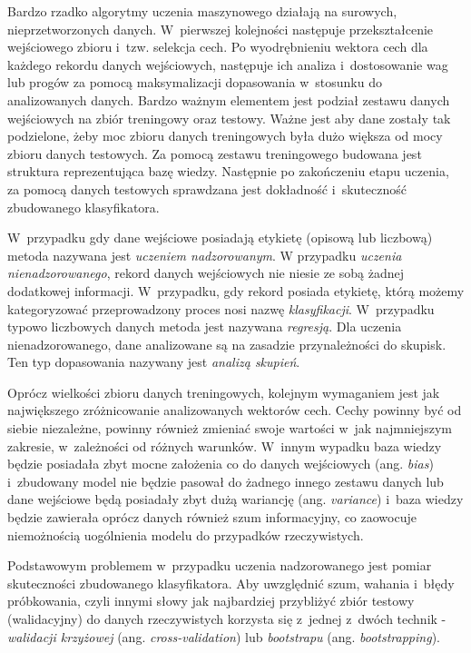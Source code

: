     Bardzo rzadko algorytmy uczenia maszynowego działają na surowych, nieprzetworzonych danych. W~pierwszej kolejności następuje przekształcenie wejściowego zbioru i~tzw. selekcja cech. Po wyodrębnieniu wektora cech dla każdego rekordu danych wejściowych, następuje ich analiza i~dostosowanie wag lub progów za pomocą maksymalizacji dopasowania w~stosunku do analizowanych danych. Bardzo ważnym elementem jest podział zestawu danych wejściowych na zbiór treningowy oraz testowy. Ważne jest aby dane zostały tak podzielone, żeby moc zbioru danych treningowych była dużo większa od mocy zbioru danych testowych. Za pomocą zestawu treningowego budowana jest struktura reprezentująca bazę wiedzy. Następnie po zakończeniu etapu uczenia, za pomocą danych testowych sprawdzana jest dokładność i~skuteczność zbudowanego klasyfikatora.

    W~przypadku gdy dane wejściowe posiadają etykietę (opisową lub liczbową) metoda nazywana jest \textit{uczeniem nadzorowanym}. W przypadku \textit{uczenia nienadzorowanego}, rekord danych wejściowych nie niesie ze sobą żadnej dodatkowej informacji. W~przypadku, gdy rekord posiada etykietę, którą możemy kategoryzować przeprowadzony proces nosi nazwę \textit{klasyfikacji}. W~przypadku typowo liczbowych danych metoda jest nazywana \textit{regresją}. Dla uczenia nienadzorowanego, dane analizowane są na zasadzie przynależności do skupisk. Ten typ dopasowania nazywany jest \textit{analizą skupień}.

    Oprócz wielkości zbioru danych treningowych, kolejnym wymaganiem jest jak największego zróżnicowanie analizowanych wektorów cech. Cechy powinny być od siebie niezależne, powinny również zmieniać swoje wartości w~jak najmniejszym zakresie, w~zależności od różnych warunków. W~innym wypadku baza wiedzy będzie posiadała zbyt mocne założenia co do danych wejściowych (ang. \textit{bias}) i~zbudowany model nie będzie pasował do żadnego innego zestawu danych lub dane wejściowe będą posiadały zbyt dużą wariancję (ang. \textit{variance}) i~baza wiedzy będzie zawierała oprócz danych również szum informacyjny, co zaowocuje niemożnością uogólnienia modelu do przypadków rzeczywistych.

    Podstawowym problemem w~przypadku uczenia nadzorowanego jest pomiar skuteczności zbudowanego klasyfikatora. Aby uwzględnić szum, wahania i~błędy próbkowania, czyli innymi słowy jak najbardziej przybliżyć zbiór testowy (walidacyjny) do danych rzeczywistych korzysta się z~jednej z~dwóch technik - \textit{walidacji krzyżowej} (ang. \textit{cross-validation}) lub \textit{bootstrapu} (ang. \textit{bootstrapping}).

